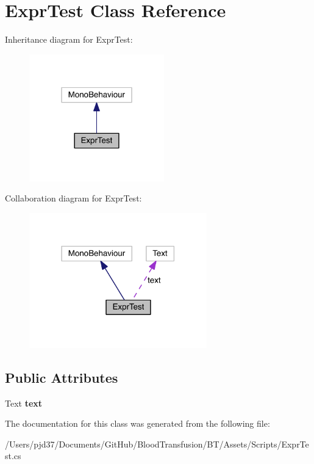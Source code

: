 \hypertarget{class_expr_test}{}\section{Expr\+Test Class Reference}
\label{class_expr_test}


Inheritance diagram for Expr\+Test\+:\nopagebreak
\begin{figure}[H]
\begin{center}
\leavevmode
\includegraphics[width=166pt]{class_expr_test__inherit__graph}
\end{center}
\end{figure}


Collaboration diagram for Expr\+Test\+:\nopagebreak
\begin{figure}[H]
\begin{center}
\leavevmode
\includegraphics[width=218pt]{class_expr_test__coll__graph}
\end{center}
\end{figure}
\subsection*{Public Attributes}
\begin{DoxyCompactItemize}
\item 
Text {\bfseries text}\hypertarget{class_expr_test_a482f38da1575d03a1f18ac730d6ccf24}{}\label{class_expr_test_a482f38da1575d03a1f18ac730d6ccf24}

\end{DoxyCompactItemize}


The documentation for this class was generated from the following file\+:\begin{DoxyCompactItemize}
\item 
/\+Users/pjd37/\+Documents/\+Git\+Hub/\+Blood\+Transfusion/\+B\+T/\+Assets/\+Scripts/Expr\+Test.\+cs\end{DoxyCompactItemize}
